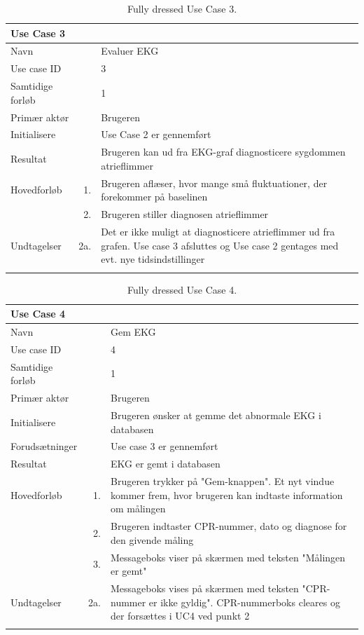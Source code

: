 \begin{longtabu} to  %
    {\large \textbf{Use Case 3}} && \\
    \toprule
    Navn &&    Evaluer EKG\\
    Use case ID &&    3\\
    Samtidige forløb &&    1\\
    Primær aktør &&    Brugeren\\
    Initialisere &&    Use Case 2 er gennemført   \\
    Resultat &&   Brugeren kan ud fra EKG-graf diagnosticere sygdommen atrieflimmer  \\ \midrule
    Hovedforløb &    1. &    Brugeren aflæser, hvor mange små fluktuationer, der forekommer på baselinen \\[-1ex]	
                &    2. &    Brugeren stiller diagnosen atrieflimmer\\ \midrule
                
    Undtagelser &    2a. &    Det er ikke muligt at diagnosticere atrieflimmer ud fra grafen. Use case 3 afsluttes og Use case 2 gentages med evt. nye tidsindstillinger \\ \bottomrule
\caption{Fully dressed Use Case 3.}
\label{UC3}
\end{longtabu}

\begin{longtabu} to  %
    {\large \textbf{Use Case 4}} && \\
    \toprule
    Navn &&    Gem EKG\\
    Use case ID &&    4\\
    Samtidige forløb &&    1\\
    Primær aktør &&    Brugeren\\
    Initialisere &&    Brugeren ønsker at gemme det abnormale EKG i databasen\\
    Forudsætninger &&  Use case 3 er gennemført\\
    Resultat &&    EKG er gemt i databasen                    \\ \midrule
    Hovedforløb &    1. &    Brugeren trykker på "Gem-knappen". Et nyt vindue kommer frem, hvor brugeren kan indtaste information om målingen\\[-1ex]   						 	
                &    2. &	Brugeren indtaster CPR-nummer, dato og diagnose for den givende måling\\[-1ex]                	
                &	3. &		Messageboks viser på skærmen med teksten "Målingen er gemt" \\ \midrule
                
    Undtagelser &    2a. & Messageboks vises på skærmen med teksten "CPR-nummer er ikke gyldig". CPR-nummerboks cleares og der forsættes i UC4 ved punkt 2     \\ \bottomrule
\caption{Fully dressed Use Case 4.}
\label{UC4}
\end{longtabu}

